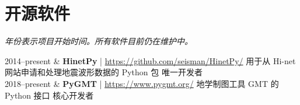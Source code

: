 \section{开源软件}

\emph{年份表示项目开始时间。所有软件目前仍在维护中。}

\begin{EntriesTable}{0.13}{0.02}{0.85}
2014--present & \textbf{HinetPy} | \url{https://github.com/seisman/HinetPy/} \newline
                用于从 Hi-net 网站申请和处理地震波形数据的 Python 包 \newline
                唯一开发者 \\
2018--present & \textbf{PyGMT} | \url{https://www.pygmt.org/} \newline
                地学制图工具 GMT 的 Python 接口 \newline
                核心开发者 \\
\end{EntriesTable}
